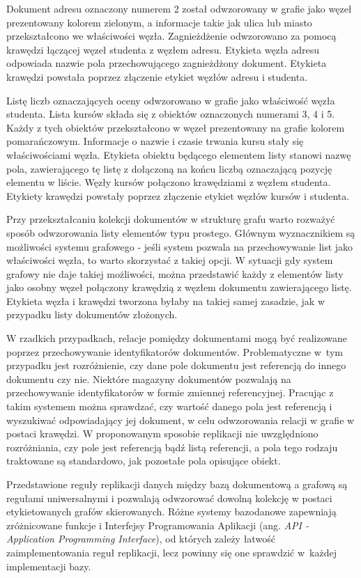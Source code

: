 \documentclass[a4paper,twoside,12pt]{book}
\newcommand{\obcy}[1]{\emph{#1}}
\newcommand{\ang}[1]{{\selectlanguage{british}\obcy{#1}}}
\begin{document}
Dokument adresu oznaczony numerem 2 został odwzorowany w grafie jako węzeł prezentowany kolorem zielonym, a informacje takie jak ulica lub miasto przekształcono we właściwości węzła. Zagnieżdżenie odwzorowano za pomocą krawędzi łączącej węzeł studenta z węzłem adresu. Etykieta węzła adresu odpowiada nazwie pola przechowującego zagnieżdżony dokument. Etykieta krawędzi powstała poprzez złączenie etykiet węzłów adresu i studenta. 

Listę liczb oznaczających oceny odwzorowano w grafie jako właściwość węzła studenta. Lista kursów składa się z obiektów oznaczonych numerami 3, 4 i 5. Każdy z tych obiektów przekształcono w węzeł prezentowany na grafie kolorem pomarańczowym. Informacje o nazwie i czasie trwania kursu stały się właściwościami węzła. Etykieta obiektu będącego elementem listy stanowi nazwę pola, zawierającego tę listę z dołączoną na końcu liczbą oznaczającą pozycję elementu w liście. Węzły kursów połączono krawędziami z węzłem studenta. Etykiety krawędzi powstały poprzez złączenie etykiet węzłów kursów i studenta.

Przy przekształcaniu kolekcji dokumentów w strukturę grafu warto rozważyć sposób odwzorowania listy elementów typu prostego. Głównym wyznacznikiem są możliwości systemu grafowego - jeśli system pozwala na przechowywanie list jako właściwości węzła, to warto skorzystać z takiej opcji. W sytuacji gdy system grafowy nie daje takiej możliwości, można przedstawić każdy z elementów listy jako osobny węzeł połączony krawędzią z węzłem dokumentu zawierającego listę. Etykieta węzła i krawędzi tworzona byłaby na takiej samej zasadzie, jak w przypadku listy dokumentów złożonych.

W rzadkich przypadkach, relacje pomiędzy dokumentami mogą być realizowane poprzez przechowywanie identyfikatorów dokumentów. Problematyczne w~tym przypadku jest rozróżnienie, czy dane pole dokumentu jest referencją do innego dokumentu czy nie. Niektóre magazyny dokumentów pozwalają na przechowywanie identyfikatorów w formie zmiennej referencyjnej. Pracując z takim systemem można sprawdzać, czy wartość danego pola jest referencją i wyszukiwać odpowiadający jej dokument, w celu odwzorowania relacji w grafie w postaci krawędzi. W proponowanym sposobie replikacji nie uwzględniono rozróżniania, czy pole jest referencją bądź listą referencji, a pola tego rodzaju traktowane są standardowo, jak pozostałe pola opisujące obiekt.

Przedstawione reguły replikacji danych między bazą dokumentową a grafową są regułami uniwersalnymi i pozwalają odwzorować dowolną kolekcję w postaci etykietowanych grafów skierowanych. Różne systemy bazodanowe zapewniają zróżnicowane funkcje i Interfejsy Programowania Aplikacji (ang. \ang{API - Application Programming Interface}), od których zależy łatwość zaimplementowania reguł replikacji, lecz powinny się one sprawdzić w~każdej implementacji bazy.
\end{document}
